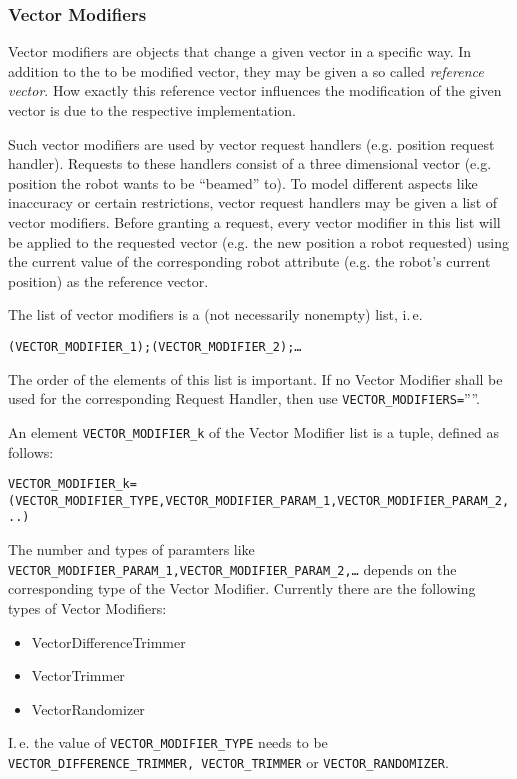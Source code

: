 \subsubsection{Vector Modifiers}\label{sec:vectorModifiers}

Vector modifiers are objects that change a given vector in a specific way. In addition to the to be modified vector, they may be given a so called \emph{reference vector}. How exactly this reference vector influences the modification of the given vector is due to the respective implementation.

Such vector modifiers are used by vector request handlers (e.g. position request handler). Requests to these handlers consist of a three dimensional vector (e.g. position the robot wants to be ``beamed'' to). To model different aspects like inaccuracy or certain restrictions, vector request handlers may be given a list of vector modifiers. Before granting a request, every vector modifier in this list will be applied to the requested vector (e.g. the new position a robot requested) using the current value of the corresponding robot attribute (e.g. the robot's current position) as the reference vector.

The list of vector modifiers is a (not necessarily nonempty) list, i.\,e. 
\begin{center}\scriptsize
	\texttt{(VECTOR\_MODIFIER\_1);(VECTOR\_MODIFIER\_2);\dots}
\end{center}
The order of the elements of this list is important. If no Vector Modifier shall be used for the corresponding Request Handler, then use \texttt{VECTOR\_MODIFIERS=}''''.

An element \texttt{VECTOR\_MODIFIER\_k} of the Vector Modifier list is a tuple, defined as follows:
\begin{center}\scriptsize
	\texttt{VECTOR\_MODIFIER\_k=(VECTOR\_MODIFIER\_TYPE,VECTOR\_MODIFIER\_PARAM\_1,VECTOR\_MODIFIER\_PARAM\_2,..)}
\end{center}
The number and types of paramters like \texttt{VECTOR\_MODIFIER\_PARAM\_1,\newline VECTOR\_MODIFIER\_PARAM\_2,\dots} depends on the corresponding type of the Vector Modifier. Currently there are the following types of Vector Modifiers:
\begin{itemize}
	\item VectorDifferenceTrimmer
	\item VectorTrimmer
	\item VectorRandomizer
\end{itemize}
I.\,e. the value of \texttt{VECTOR\_MODIFIER\_TYPE} needs to be \texttt{VECTOR\_DIFFERENCE\_TRIMMER, VECTOR\_TRIMMER} or \texttt{VECTOR\_RANDOMIZER}.


